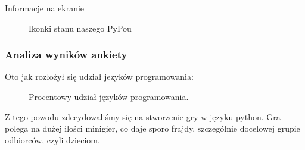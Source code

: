 \documentclass{beamer}
\begin{document}
\begin{frame}{Informacje na ekranie}
    \begin{figure}%
    \centering
    \qquad
    \qquad
    \qquad
    \caption{Ikonki stanu naszego PyPou}%
    \label{fig:example}%
    \end{figure}
\end{frame}

\begin{frame}
\frametitle{Analiza wyników ankiety}
Oto jak rozłożył się udział jezyków programowania:
\begin{figure}[h]
  \centering
  \caption{Procentowy udział języków programowania.}
  \label{fig:wykres_kolowy}
\end{figure}
Z tego powodu zdecydowaliśmy się na stworzenie gry w języku python.
Gra polega na dużej ilości minigier, co daje sporo frajdy, szczególnie docelowej grupie odbiorców, czyli dzieciom.
\end{frame}
\end{document}
